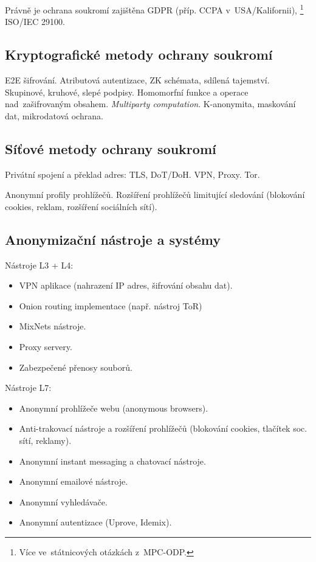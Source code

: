 Právně je ochrana soukromí zajištěna GDPR (příp. CCPA v~USA/Kalifornii),%
\footnote{Více ve~státnicových otázkách z~MPC-ODP.}
ISO/IEC 29100.


\subsection{Kryptografické metody ochrany soukromí}

E2E šifrování.
Atributová autentizace, ZK schémata, sdílená tajemství.
Skupinové, kruhové, slepé podpisy.
Homomorfní funkce a operace nad~zašifrovaným obsahem.
\emph{Multiparty computation}.
K-anonymita, maskování dat, mikrodatová ochrana.


\subsection{Síťové metody ochrany soukromí}

Privátní spojení a překlad adres: TLS, DoT/DoH.
VPN, Proxy.
Tor.

Anonymní profily prohlížečů.
Rozšíření prohlížečů limitující sledování (blokování cookies, reklam, rozšíření sociálních sítí).

\subsection{Anonymizační nástroje a systémy}
Nástroje L3 + L4:
\begin{itemize}
    \item VPN aplikace (nahrazení IP adres, šifrování obsahu dat).
    \item Onion routing implementace (např. nástroj ToR)
    \item MixNets nástroje.
    \item Proxy servery.
    \item Zabezpečené přenosy souborů.
\end{itemize}

Nástroje L7:
\begin{itemize}
    \item Anonymní prohlížeče webu (anonymous browsers).
    \item Anti-trakovací nástroje a rozšíření prohlížečů (blokování cookies,
tlačítek soc. sítí, reklamy).
    \item Anonymní instant messaging a chatovací nástroje.
    \item Anonymní emailové nástroje.
    \item Anonymní vyhledávače.
    \item Anonymní autentizace (Uprove, Idemix).
\end{itemize}

